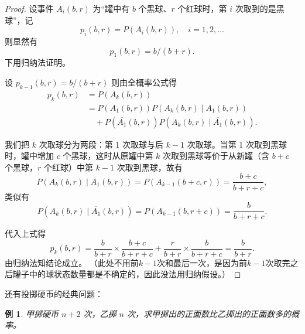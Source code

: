 \documentclass[a4paper]{ctexart}
\newtheorem{example}{例}[section]
\begin{document}
\begin{proof}
    设事件 \( A_i(b,r) \) 为“罐中有 \( b \) 个黑球、\( r \) 个红球时，第 \( i \) 次取到的是黑球”，记
    \[ p_i(b,r) = P(A_i(b,r)), \quad i = 1, 2, \dots \]
    则显然有
    \[ p_1(b,r) = b/(b+r). \]
    下用归纳法证明。

    设 $p_{k-1}(b,r) = b/(b+r)$
    则由全概率公式得
    \begin{align*}
        p_k(b,r) &= P(A_k(b,r)) \\
        &= P(A_1(b,r)) P(A_k(b,r) \mid A_1(b,r)) \\
        &\quad + P(\overline{A_1}(b,r)) P(A_k(b,r) \mid \overline{A_1}(b,r)).
    \end{align*}

    我们把 \( k \) 次取球分为两段：第 1 次取球与后 \( k-1 \) 次取球。当第 1 次取到黑球时，罐中增加 \( c \) 个黑球，这时从原罐中第 \( k \) 次取到黑球等价于从新罐（含 \( b+c \) 个黑球，\( r \) 个红球）中第 \( k-1 \) 次取到黑球，故有
    \[ P(A_k(b,r) \mid A_1(b,r)) = P(A_{k-1}(b+c, r)) = \frac{b+c}{b+r+c}, \]
    类似有
    \[ P(A_k(b,r) \mid \overline{A_1}(b,r)) = P(A_{k-1}(b, r+c)) = \frac{b}{b+r+c}. \]

    代入上式得
    \[ p_k(b,r) = \frac{b}{b+r} \times \frac{b+c}{b+r+c} + \frac{r}{b+r} \times \frac{b}{b+r+c} = \frac{b}{b+r}. \]
    由归纳法知结论成立。
    （此处不用前$k-1$次和最后一次，是因为前$k-1$次取完之后罐子中的球状态数量都是不确定的，因此没法用归纳假设。）
\end{proof}
还有投掷硬币的经典问题：
\begin{example}
    甲掷硬币 \( n + 2 \) 次，乙掷 \( n \) 次，求甲掷出的正面数比乙掷出的正面数多的概率。
\end{example}
\end{document}
